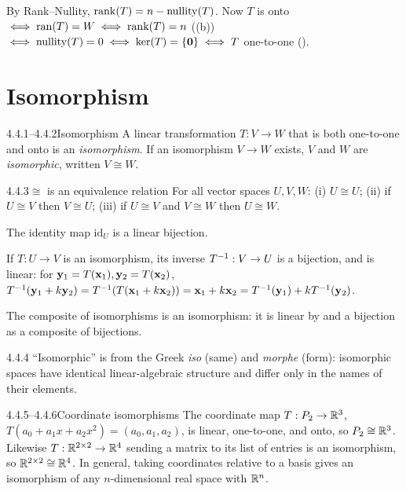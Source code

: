 \begin{prf}
By Rank--Nullity, $\operatorname{rank}(T)=n-\operatorname{nullity}(T)$. Now $T$ is onto $\iff\operatorname{ran}(T)=W\iff\operatorname{rank}(T)=n$ ((b)) $\iff\operatorname{nullity}(T)=0\iff\ker(T)=\{\mathbf{0}\}\iff T$ one-to-one ().
\end{prf}

\section{Isomorphism}
\label{sec:4.4}

\begin{defns}{4.4.1--4.4.2}{Isomorphism}
A linear transformation $T:V\to W$ that is both one-to-one and onto is an \emph{isomorphism}. If an isomorphism $V\to W$ exists, $V$ and $W$ are \emph{isomorphic}, written $V\cong W$.
\end{defns}

\begin{thms}{4.4.3}{$\cong$ is an equivalence relation}
For all vector spaces $U,V,W$: \textup{(i)} $U\cong U$; \textup{(ii)} if $U\cong V$ then $V\cong U$; \textup{(iii)} if $U\cong V$ and $V\cong W$ then $U\cong W$.
\end{thms}

\begin{prf}
 The identity map $\mathrm{id}_U$ is a linear bijection.

 If $T:U\to V$ is an isomorphism, its inverse $T^{-1}:V\to U$ is a bijection, and is linear: for $\mathbf{y}_1=T(\mathbf{x}_1),\mathbf{y}_2=T(\mathbf{x}_2)$, $T^{-1}(\mathbf{y}_1+k\mathbf{y}_2)=T^{-1}(T(\mathbf{x}_1+k\mathbf{x}_2))=\mathbf{x}_1+k\mathbf{x}_2=T^{-1}(\mathbf{y}_1)+kT^{-1}(\mathbf{y}_2)$.

 The composite of isomorphisms is an isomorphism: it is linear by  and a bijection as a composite of bijections.
\end{prf}

\begin{rmks}{4.4.4}
``Isomorphic'' is from the Greek \emph{iso} (same) and \emph{morphe} (form): isomorphic spaces have identical linear-algebraic structure and differ only in the names of their elements.
\end{rmks}

\begin{exmp}{4.4.5--4.4.6}{Coordinate isomorphisms}
The coordinate map $T:P_2\to\mathbb{R}^3$, $T(a_0+a_1x+a_2x^2)=(a_0,a_1,a_2)$, is linear, one-to-one, and onto, so $P_2\cong\mathbb{R}^3$. Likewise $T:\mathbb{R}^{2\times2}\to\mathbb{R}^4$ sending a matrix to its list of entries is an isomorphism, so $\mathbb{R}^{2\times2}\cong\mathbb{R}^4$. In general, taking coordinates relative to a basis gives an isomorphism of any $n$-dimensional real space with $\mathbb{R}^n$.
\end{exmp}

